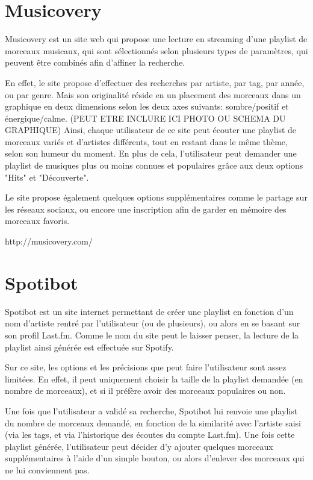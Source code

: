 
\section{Musicovery}
\label{existant:musicovery}

Musicovery est un site web qui propose une lecture en streaming d'une 
playlist de morceaux musicaux, qui sont sélectionnés selon plusieurs types 
de paramètres, qui peuvent être combinés afin d'affiner la recherche.

En effet, le site propose d'effectuer des recherches par artiste, par tag, 
par année, ou par genre. Mais son originalité réside en un placement des 
morceaux dans un graphique en deux dimensions selon les deux axes suivants:
sombre/positif et énergique/calme. (PEUT ETRE INCLURE ICI PHOTO OU SCHEMA DU GRAPHIQUE)
Ainsi, chaque utilisateur de ce site peut écouter une playlist de morceaux 
variés et d'artistes différents, tout en restant dans le même thème, selon 
son humeur du moment.
En plus de cela, l'utilisateur peut demander une playlist de musiques plus 
ou moins connues et populaires grâce aux deux options "Hits" et "Découverte".

Le site propose également quelques options supplémentaires comme le partage 
sur les réseaux sociaux, ou encore une inscription afin de garder en mémoire 
des morceaux favoris.

http://musicovery.com/

\section{Spotibot}
\label{existant:spotibot}

Spotibot est un site internet permettant de créer une playlist en fonction 
d'un nom d'artiste rentré par l'utilisateur (ou de plusieurs), ou alors en 
se basant sur son profil Last.fm. Comme le nom du site peut le laisser 
penser, la lecture de la playlist ainsi générée est effectuée sur Spotify.

Sur ce site, les options et les précisions que peut faire l'utilisateur sont 
assez limitées. En effet, il peut uniquement choisir la taille de la 
playlist demandée (en nombre de morceaux), et si il préfère avoir des 
morceaux populaires ou non.

Une fois que l'utilisateur a validé sa recherche, Spotibot lui renvoie une 
playlist du nombre de morceaux demandé, en fonction de la similarité avec 
l'artiste saisi (via les tags, et via l'historique des écoutes du compte 
Last.fm). Une fois cette playlist générée, l'utilisateur peut décider d'y 
ajouter quelques morceaux supplémentaires à l'aide d'un simple bouton, ou 
alors d'enlever des morceaux qui ne lui conviennent pas.

